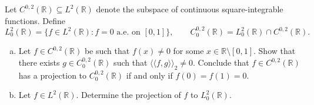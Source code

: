\documentclass[10pt]{article}
\providecommand{\RR}{\mathbb R}
\providecommand{\ii}{\item}
\begin{document}
\begin{problem}
    Let $C^{0,2}(\RR)\subseteq L^2(\RR)$ denote
    the subspace of continuous square-integrable functions. Define
    \begin{equation*}
	L_0^2(\RR) = \{f\in L^2(\RR) : f = 0\text{ a.e. on }[0,1]\},\qquad
	C_0^{0,2}(\RR) = L_0^2(\RR)\cap C^{0,2}(\RR).
    \end{equation*}
    \begin{enumerate}[(a)]
	\ii Let $f\in C^{0,2}(\RR)$ be such that $f(x)\ne 0$
	for some $x\in\RR\setminus[0,1]$.
	Show that there exists $g\in C_0^{0,2}(\RR)$ such that
	$\langle\!\langle f,g \rangle\!\rangle_2\ne 0$.
	Conclude that $f\in C^{0,2}(\RR)$ has a projection to $C^{0,2}_0(\RR)$
	if and only if $f(0) = f(1) = 0$.
	\ii Let $f\in L^2(\RR)$. Determine the projection of $f$ to $L_0^2(\RR)$.
    \end{enumerate}
\end{problem}
\end{document}
